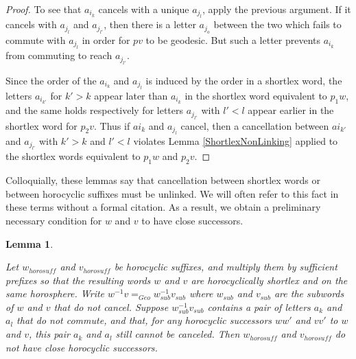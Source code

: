 \documentclass{amsart}
\newtheorem{lemma}[theorem]{Lemma}
\theoremstyle{definition}
\theoremstyle{remark}
\begin{document}
	\begin{proof}
		
		To see that $a_{i_k}$ cancels with a unique $a_{j_l}$, apply the previous argument. If it cancels with $a_{j_l}$ and $a_{j_{l'}}$, then there is a letter $a_{j_o}$ between the two which fails to commute with $a_{j_l}$ in order for $pv$ to be geodesic. But such a letter prevents $a_{i_k}$ from commuting to reach $a_{j_{l'}}$. 
		
		Since the order of the $a_{i_k}$ and $a_{j_l}$ is induced by the order in a shortlex word, the letters $a_{i_{k'}}$ for $k'>k$ appear later than $a_{i_k}$ in the shortlex word equivalent to $p_1w$, and the same holds respectively for letters $a_{j_{l'}}$ with $l'<l$ appear earlier in the shortlex word for $p_2v$. Thus if $a{i_k}$ and $a_{j_l}$ cancel, then a cancellation between $a{i_{k'}}$ and $a_{j_{l'}}$ with $k'>k$ and $l'<l$ violates Lemma \ref{ShortlexNonLinking} applied to the shortlex words equivalent to $p_1w$ and $p_2v$.	
	\end{proof}
	
	Colloquially, these lemmas say that cancellation between shortlex words or between horocyclic suffixes must be unlinked. We will often refer to this fact in these terms without a formal citation. As a result, we obtain a preliminary necessary condition for $w$ and $v$ to have close successors.
	
	\begin{lemma}\label{DivergenceGraphEdgeNecessaryCondition}
		
		Let $w_{horosuff}$ and $v_{horosuff}$ be horocyclic suffixes, and multiply them by sufficient prefixes so that the resulting words $w$ and $v$ are horocyclically shortlex and on the same horosphere. Write $w^{-1}v=_{Geo}w_{sub}^{-1}v_{sub}$ where $w_{sub}$ and $v_{sub}$ are the subwords of $w$ and $v$ that do not cancel. Suppose $w_{sub}^{-1}v_{sub}$ contains a pair of letters $a_k$ and $a_l$ that do not commute, and that, for any horocyclic successors $ww'$ and $vv'$ to $w$ and $v$, this pair $a_k$ and $a_l$ still cannot be canceled. Then $w_{horosuff}$ and $v_{horosuff}$ do not have close horocyclic successors.
		
	\end{lemma}
	
\end{document}
